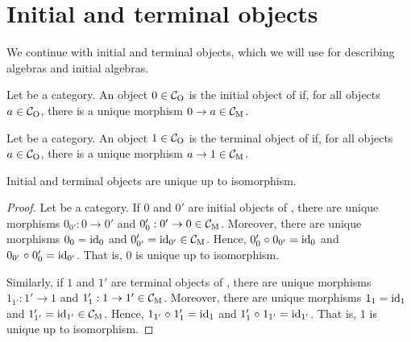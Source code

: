 \section{Initial and terminal objects}
\label{sec:constructions-initial-terminal-objects}

We continue with initial and terminal objects, which we will use for
describing algebras and initial algebras.

\begin{definition}


  \label{def:initial-object}


  Let  be a category. An object $0 \in \mathcal{C}_{\operatorname{O}}$ is the initial
  object of  if, for all objects $a \in \mathcal{C}_{\operatorname{O}}$, there is a
  unique morphism $0 \to a \in \mathcal{C}_{\operatorname{M}}$.

\end{definition}

\begin{definition}


  \label{def:terminal-object}


  Let  be a category. An object $1 \in \mathcal{C}_{\operatorname{O}}$ is the
  terminal object of  if, for all objects $a \in \mathcal{C}_{\operatorname{O}}$,
  there is a unique morphism $a \to 1 \in \mathcal{C}_{\operatorname{M}}$.

\end{definition}

\begin{lemma}

  Initial and terminal objects are unique up to isomorphism.

  \begin{proof}

    Let  be a category. If $0$ and $0'$ are initial objects of
    , there are unique morphisms $0_{0'}: 0 \to 0'$ and
    $0'_{0}: 0' \to 0 \in \mathcal{C}_{\operatorname{M}}$. Moreover, there are unique
    morphisms $0_{0} = \operatorname{id}_{0}$ and $0'_{0'} = \operatorname{id}_{0'} \in \mathcal{C}_{\operatorname{M}}$.
    Hence, $0'_{0} \mathrel{\circ} 0_{0'} = \operatorname{id}_{0}$ and $0_{0'} \mathrel{\circ} 0'_{0} =
    \operatorname{id}_{0'}$. That is, $0$ is unique up to isomorphism.

    Similarly, if $1$ and $1'$ are terminal objects of , there
    are unique morphisms $1_{1'}: 1' \to 1$ and $1'_{1}: 1 \to 1' \in
    \mathcal{C}_{\operatorname{M}}$. Moreover, there are unique morphisms $1_{1} = \operatorname{id}_{1}$
    and $1'_{1'} = \operatorname{id}_{1'} \in \mathcal{C}_{\operatorname{M}}$. Hence, $1_{1'} \mathrel{\circ} 1'_{1}
    = \operatorname{id}_{1}$ and $1'_{1} \mathrel{\circ} 1_{1'} = \operatorname{id}_{1'}$. That is, $1$ is
    unique up to isomorphism.

  \end{proof}

\end{lemma}

